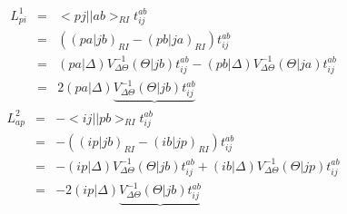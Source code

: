 \documentclass[fleqn,12pt]{article}
\newcommand{\bra}{<\!}
\newcommand{\ket}{\!>}
\newcommand{\tijab}{{t_{ij}^{ab}}}
\newcommand{\intari}[2]{\bra #1 || #2 \ket_{RI}}
\newcommand{\intmri}[2]{( #1 | #2 )_{RI}}
\begin{document}
\begin{changebar}
\begin{eqnarray}
  L^1_{pi} & = & \intari{pj}{ab} \tijab \\
           & = & ( \intmri{pa}{jb} - \intmri{pb}{ja} ) \tijab \\
           & = &   (pa|\Delta) V^{-1}_{\Delta\Theta} (\Theta|jb) \tijab
                 - (pb|\Delta) V^{-1}_{\Delta\Theta} (\Theta|ja) \tijab \\
           & = & 2 (pa|\Delta) 
                   \underbrace{V^{-1}_{\Delta\Theta} (\Theta|jb) \tijab}
\end{eqnarray}
\begin{eqnarray}
  L^2_{ap} & = & - \intari{ij}{pb} \tijab \\
           & = & - ( \intmri{ip}{jb} - \intmri{ib}{jp} ) \tijab \\
           & = & -  (ip|\Delta) V^{-1}_{\Delta\Theta} (\Theta|jb) \tijab
                 +  (ib|\Delta) V^{-1}_{\Delta\Theta} (\Theta|jp) \tijab \\
           & = & -2 (ip|\Delta) 
                    \underbrace{V^{-1}_{\Delta\Theta} (\Theta|jb) \tijab}
\end{eqnarray}



\end{changebar}
\end{document}
